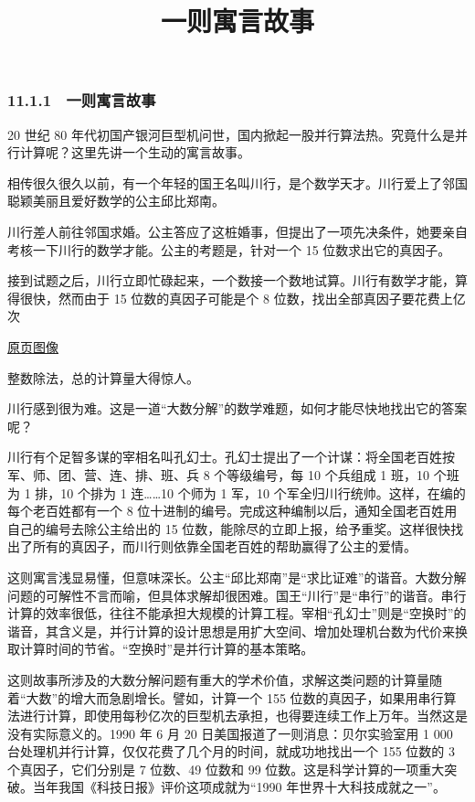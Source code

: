 \documentclass[
  10pt,
  fontset=fandol]{ctexart}
\title{一则寓言故事}
\author{}
\date{}
\begin{document}
\maketitle

\subsubsection{11.1.1　一则寓言故事}\label{ux4e00ux5219ux5bd3ux8a00ux6545ux4e8b}

20 世纪 80 年代初国产银河巨型机问世，国内掀起一股并行算法热。究竟什么是并行计算呢？这里先讲一个生动的寓言故事。

相传很久很久以前，有一个年轻的国王名叫川行，是个数学天才。川行爱上了邻国聪颖美丽且爱好数学的公主邱比郑南。

川行差人前往邻国求婚。公主答应了这桩婚事，但提出了一项先决条件，她要亲自考核一下川行的数学才能。公主的考题是，针对一个 15 位数求出它的真因子。

接到试题之后，川行立即忙碌起来，一个数接一个数地试算。川行有数学才能，算得很快，然而由于 15 位数的真因子可能是个 8 位数，找出全部真因子要花费上亿次

\href{../../source-images/pdf-277.jpeg}{原页图像}

整数除法，总的计算量大得惊人。

川行感到很为难。这是一道``大数分解''的数学难题，如何才能尽快地找出它的答案呢？

川行有个足智多谋的宰相名叫孔幻士。孔幻士提出了一个计谋：将全国老百姓按军、师、团、营、连、排、班、兵 8 个等级编号，每 10 个兵组成 1 班，10 个班为 1 排，10 个排为 1 连\ldots\ldots10 个师为 1 军，10 个军全归川行统帅。这样，在编的每个老百姓都有一个 8 位十进制的编号。完成这种编制以后，通知全国老百姓用自己的编号去除公主给出的 15 位数，能除尽的立即上报，给予重奖。这样很快找出了所有的真因子，而川行则依靠全国老百姓的帮助赢得了公主的爱情。

这则寓言浅显易懂，但意味深长。公主``邱比郑南''是``求比证难''的谐音。大数分解问题的可解性不言而喻，但具体求解却很困难。国王``川行''是``串行''的谐音。串行计算的效率很低，往往不能承担大规模的计算工程。宰相``孔幻士''则是``空换时''的谐音，其含义是，并行计算的设计思想是用扩大空间、增加处理机台数为代价来换取计算时间的节省。``空换时''是并行计算的基本策略。

这则故事所涉及的大数分解问题有重大的学术价值，求解这类问题的计算量随着``大数''的增大而急剧增长。譬如，计算一个 155 位数的真因子，如果用串行算法进行计算，即使用每秒亿次的巨型机去承担，也得要连续工作上万年。当然这是没有实际意义的。1990 年 6 月 20 日美国报道了一则消息：贝尔实验室用 1 000 台处理机并行计算，仅仅花费了几个月的时间，就成功地找出一个 155 位数的 3 个真因子，它们分别是 7 位数、49 位数和 99 位数。这是科学计算的一项重大突破。当年我国《科技日报》评价这项成就为``1990 年世界十大科技成就之一''。
\end{document}

